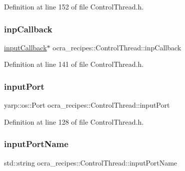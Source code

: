 Definition at line 152 of file Control\+Thread.\+h.

\hypertarget{classocra__recipes_1_1ControlThread_af8da6d1e1079de5d0b53dc6bbad75055}{}\label{classocra__recipes_1_1ControlThread_af8da6d1e1079de5d0b53dc6bbad75055} 
\subsubsection{\texorpdfstring{inp\+Callback}{inpCallback}}
{\footnotesize\ttfamily \hyperlink{classocra__recipes_1_1ControlThread_1_1inputCallback}{input\+Callback}$\ast$ ocra\+\_\+recipes\+::\+Control\+Thread\+::inp\+Callback\hspace{0.3cm}{\ttfamily [protected]}}



Definition at line 141 of file Control\+Thread.\+h.

\hypertarget{classocra__recipes_1_1ControlThread_a3c6a392da512677af0b6c20f5ed357c1}{}\label{classocra__recipes_1_1ControlThread_a3c6a392da512677af0b6c20f5ed357c1} 
\subsubsection{\texorpdfstring{input\+Port}{inputPort}}
{\footnotesize\ttfamily yarp\+::os\+::\+Port ocra\+\_\+recipes\+::\+Control\+Thread\+::input\+Port\hspace{0.3cm}{\ttfamily [protected]}}



Definition at line 128 of file Control\+Thread.\+h.

\hypertarget{classocra__recipes_1_1ControlThread_a4979cfd87cd758473a2ec367f47be17f}{}\label{classocra__recipes_1_1ControlThread_a4979cfd87cd758473a2ec367f47be17f} 
\subsubsection{\texorpdfstring{input\+Port\+Name}{inputPortName}}
{\footnotesize\ttfamily std\+::string ocra\+\_\+recipes\+::\+Control\+Thread\+::input\+Port\+Name\hspace{0.3cm}{\ttfamily [protected]}}



